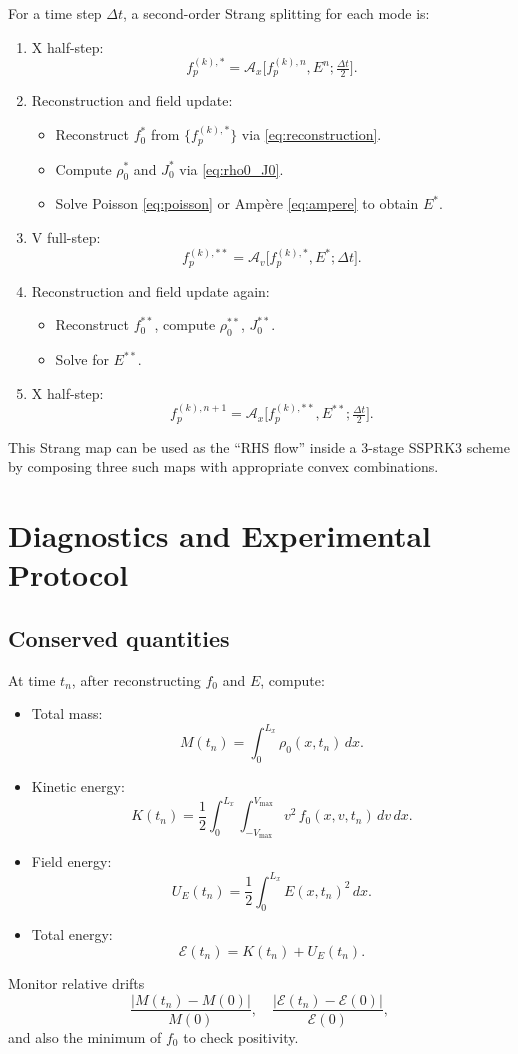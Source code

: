 \documentclass[11pt]{article}
\begin{document}
For a time step $\Delta t$, a second-order Strang splitting for each mode is:
\begin{enumerate}
  \item X half-step:
    \[
      f_p^{(k),*} = \mathcal{A}_x\big[f_p^{(k),n}, E^n; \tfrac{\Delta t}{2}\big].
    \]
  \item Reconstruction and field update:
    \begin{itemize}
      \item Reconstruct $f_0^*$ from $\{f_p^{(k),*}\}$ via \eqref{eq:reconstruction}.
      \item Compute $\rho_0^*$ and $J_0^*$ via \eqref{eq:rho0_J0}.
      \item Solve Poisson \eqref{eq:poisson} or Amp\`ere \eqref{eq:ampere} to
            obtain $E^*$.
    \end{itemize}
  \item V full-step:
    \[
      f_p^{(k),**} = \mathcal{A}_v\big[f_p^{(k),*}, E^*; \Delta t\big].
    \]
  \item Reconstruction and field update again:
    \begin{itemize}
      \item Reconstruct $f_0^{**}$, compute $\rho_0^{**}$, $J_0^{**}$.
      \item Solve for $E^{**}$.
    \end{itemize}
  \item X half-step:
    \[
      f_p^{(k),n+1} = \mathcal{A}_x\big[f_p^{(k),**}, E^{**}; \tfrac{\Delta t}{2}\big].
    \]
\end{enumerate}

This Strang map can be used as the ``RHS flow'' inside a 3-stage SSPRK3
scheme by composing three such maps with appropriate convex combinations.

\section{Diagnostics and Experimental Protocol}

\subsection{Conserved quantities}

At time $t_n$, after reconstructing $f_0$ and $E$, compute:
\begin{itemize}
  \item Total mass:
    \[
      M(t_n) = \int_0^{L_x} \rho_0(x,t_n)\,dx.
    \]
  \item Kinetic energy:
    \[
      K(t_n) = \frac12 \int_0^{L_x}\int_{-V_{\max}}^{V_{\max}}
               v^2\,f_0(x,v,t_n)\,dv\,dx.
    \]
  \item Field energy:
    \[
      U_E(t_n) = \frac12 \int_0^{L_x} E(x,t_n)^2\,dx.
    \]
  \item Total energy:
    \[
      \mathcal{E}(t_n) = K(t_n) + U_E(t_n).
    \]
\end{itemize}
Monitor relative drifts
\[
  \frac{|M(t_n)-M(0)|}{M(0)},\quad
  \frac{|\mathcal{E}(t_n)-\mathcal{E}(0)|}{\mathcal{E}(0)},
\]
and also the minimum of $f_0$ to check positivity.
\end{document}
